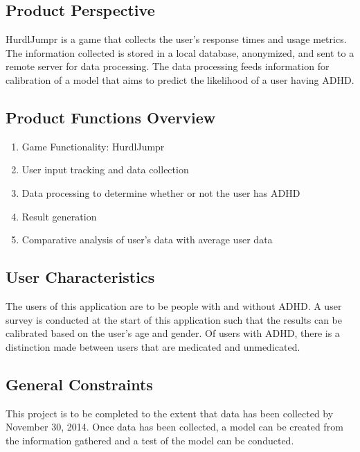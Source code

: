 \documentclass[a4wide]{article}
\begin{document}
\subsection{Product Perspective}

HurdlJumpr is a game that collects the user's response times and usage metrics.
The information collected is stored in a local database, anonymized, and sent to
a remote server for data processing. The data processing feeds information for
calibration of a model that aims to predict the likelihood of a user having
ADHD.

\subsection{Product Functions Overview}

\begin{enumerate}
\item Game Functionality: HurdlJumpr
\item User input tracking and data collection
\item Data processing to determine whether or not the user has ADHD
\item Result generation
\item Comparative analysis of user's data with average user data
\end{enumerate}

\subsection{User Characteristics}

The users of this application are to be people with and without ADHD. A user
survey is conducted at the start of this application such that the results can
be calibrated based on the user's age and gender. Of users with ADHD, there is a
distinction made between users that are medicated and unmedicated.

\subsection{General Constraints}

This project is to be completed to the extent that data has been collected by
November 30, 2014. Once data has been collected, a model can be created from the
information gathered and a test of the model can be conducted.

\end{document}
